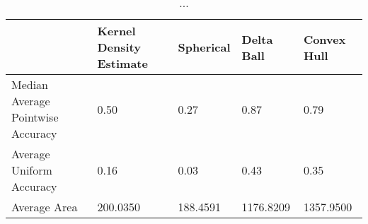 \begin{table}[ht!]
\centering
\begin{tabular}{|R{1.2in}||L{.95in}L{.8in}|L{.75in}L{.75in}|}
  \hline
  & Kernel Density Estimate & Spherical & Delta Ball & Convex Hull \\ 
  \hline
Median Average Pointwise Accuracy & 0.50 & 0.27 & 0.87 & 0.79 \\ 
  Average Uniform Accuracy & 0.16 & 0.03 & 0.43 & 0.35 \\ 
  Average Area &  200.0350 &  188.4591 & 1176.8209 & 1357.9500 \\ 
   \hline
\end{tabular}
\caption{...} 
\label{tab:median_prop_captured_and_size_summary}
\end{table}
